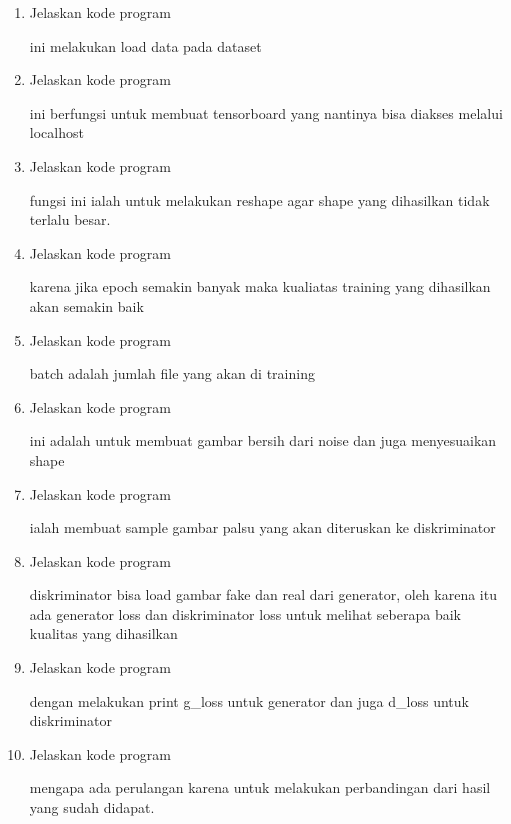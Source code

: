 \begin{enumerate}
        \item Jelaskan kode program 
        
        ini melakukan load data pada dataset
        
        \item Jelaskan kode program 
        
        ini berfungsi untuk membuat tensorboard yang nantinya bisa diakses melalui localhost
        
        \item Jelaskan kode program 
        
        fungsi ini ialah untuk melakukan reshape agar shape yang dihasilkan tidak terlalu besar.
        
        \item Jelaskan kode program 
        
        karena jika epoch semakin banyak maka kualiatas training yang dihasilkan akan semakin baik
        
        \item Jelaskan kode program 
        
        batch adalah jumlah file yang akan di training
        
        \item Jelaskan kode program 
        
        ini adalah untuk membuat gambar bersih dari noise dan juga menyesuaikan shape
        
        \item Jelaskan kode program 
        
        ialah membuat sample gambar palsu yang akan diteruskan ke diskriminator
        
        \item Jelaskan kode program 
        
        diskriminator bisa load gambar fake dan real dari generator, oleh karena itu ada generator loss dan diskriminator loss untuk melihat seberapa baik kualitas yang dihasilkan
        
        \item Jelaskan kode program 
        
        dengan melakukan print g\_loss untuk generator dan juga d\_loss untuk diskriminator
        
        \item Jelaskan kode program 
        
        mengapa ada perulangan karena untuk melakukan perbandingan dari hasil yang sudah didapat.
        

\end{enumerate}

